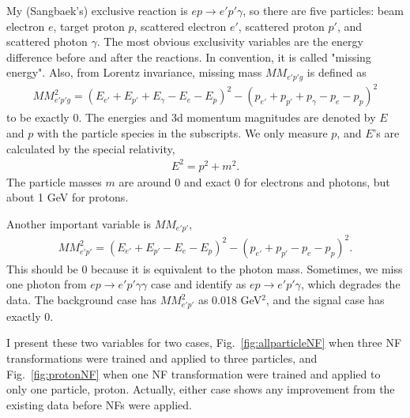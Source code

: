 My (Sangbaek's) exclusive reaction is $ep\rightarrow e'p'\gamma$, so there are five particles: beam electron $e$, target proton $p$, scattered electron $e'$, scattered proton $p'$, and scattered photon $\gamma$. The most obvious exclusivity variables are the energy difference before and after the reactions. In convention, it is called "missing energy". Also, from Lorentz invariance, missing mass $MM_{e'p'g}$ is defined as
\begin{align}
    MM_{e'p'g}^2 = (E_{e'}+E_{p'}+E_\gamma - E_e - E_p)^2 - (p_{e'}+p_{p'}+p_\gamma - p_e - p_p)^2
\end{align}
to be exactly 0. The energies and 3d momentum magnitudes are denoted by $E$ and $p$ with the particle species in the subscripts. We only measure $p$, and $E$'s are calculated by the special relativity,
\begin{align}
    E^2 = p^2 + m^2.
\end{align}
The particle masses $m$ are around 0 and exact 0 for electrons and photons, but about 1 GeV for protons.

Another important variable is $MM_{e'p'}$, 
\begin{align}
    MM_{e'p'}^2 = (E_{e'}+E_{p'} - E_e - E_p)^2 - (p_{e'}+p_{p'} - p_e - p_p)^2.
\end{align}
This should be 0 because it is equivalent to the photon mass. Sometimes, we miss one photon from $ep\rightarrow e'p'\gamma\gamma$ case and identify as $ep\rightarrow e'p'\gamma$, which degrades the data. The background case has $MM_{e'p'}^2$ as 0.018 GeV$^2$, and the signal case has exactly 0.

I present these two variables for two cases, Fig.~\ref{fig:allparticleNF} when three NF transformations were trained and applied to three particles, and Fig.~\ref{fig:protonNF} when one NF transformation were trained and applied to only one particle, proton. Actually, either case shows any improvement from the existing data before NFs were applied.


